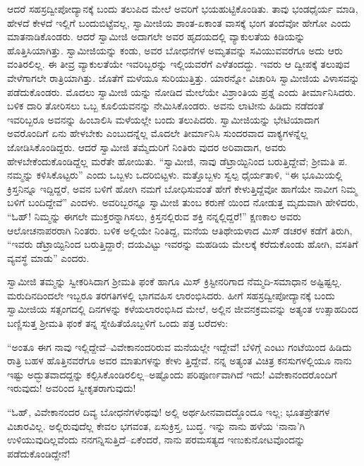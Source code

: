 ಆದರೆ ಸಹಸ್ರದ್ವೀಪೋದ್ಯಾನಕ್ಕೆ ಬಂದು ತಲುಪಿದ ಮೇಲೆ ಅವರಿಗೆ ಭಯಹುಟ್ಟಿಕೊಂಡಿತು. ತಾವು ಭಂಡಧೈರ್ಯ ಮಾಡಿ, ಹೇಳದೆ ಕೇಳದೆ ಇಲ್ಲಿಗೆ ಬಂದುಬಿಟ್ಟೆವಲ್ಲ, ಸ್ವಾಮೀಜಿಯ ಶಾಂತ-ಏಕಾಂತ ವಾಸಕ್ಕೆ ಭಂಗ ತಂದೆವೋ ಹೇಗೋ ಎಂದು ಮಾತನಾಡಿಕೊಂಡರು. ಆದರೆ ಸ್ವಾಮೀಜಿ ಅದಾಗಲೇ ಅವರ ಹೃದಯದಲ್ಲಿ ವ್ಯಾಕುಲತೆಯ ಕಿಡಿಯನ್ನು ಹೊತ್ತಿಸಿಯಾಗಿತ್ತು. ಸ್ವಾಮೀಜಿಯನ್ನು ಕಂಡು, ಅವರ ಬೋಧನೆಗಳ ಅಮೃತವನ್ನು ಸವಿಯುವವರೆಗೂ ಅದು ಆರು ವಂತಿರಲಿಲ್ಲ. ಈ ತೀವ್ರ ವ್ಯಾಕುಲತೆಯೇ ಇವರಿಬ್ಬರನ್ನು ಇಲ್ಲಿಯವರೆಗೆ ಎಳೆತಂದದ್ದು. ಇವರು ಆ ದ್ವೀಪಕ್ಕೆ ತಲುಪುವ ವೇಳೆಗಾಗಲೇ ರಾತ್ರಿಯಾಗಿತ್ತು. ಜೊತೆಗೆ ಮಳೆಯೂ ಸುರಿಯುತ್ತಿತ್ತು. ಯಾರನ್ನೋ ವಿಚಾರಿಸಿ ಸ್ವಾಮೀಜಿಯ ವಿಳಾಸವನ್ನು ಪಡೆದುಕೊಂಡರು. ಮೊದಲು ಸ್ವಾಮೀಜಿ ಯನ್ನು ನೋಡಿದ ಮೇಲೆಯೇ ವಿಶ್ರಾಂತಿಯ ಪ್ರಶ್ನೆ ಎಂದು ತೀರ್ಮಾನಿಸಿದರು. ಬಳಿಕ ದಾರಿ ತೋರಿಸಲು ಒಬ್ಬ ಕೂಲಿಯವನನ್ನು ನೇಮಿಸಿಕೊಂಡರು. ಅವನು ಲಾಟೀನು ಹಿಡಿದು ನಡೆದಂತೆ ಇವರಿಬ್ಬರೂ ಅವನನ್ನು ಹಿಂಬಾಲಿಸಿ ಮಳೆಯಲ್ಲೇ ಬಂದು ತಲುಪಿದರು. ಸ್ವಾಮೀಜಿಯನ್ನು ಭೇಟಿಯಾದಾಗ ಅವರೊಂದಿಗೆ ಏನು ಹೇಳಬೇಕು ಎಂಬುದನ್ನೆಲ್ಲ ಮೊದಲೇ ತೀರ್ಮಾನಿಸಿ ಸುಂದರವಾದ ವಾಕ್ಯಗಳನ್ನೆಲ್ಲ ಜೋಡಿಸಿಕೊಂಡಿದ್ದರು. ಆದರೆ ಸ್ವಾಮೀಜಿ ತಮ್ಮೆದುರಿಗೆ ನಿಂತಿರು ವುದರ ಅರಿವಾದಾಗ, ಅವರು ಹೇಳಬೇಕೆಂದುಕೊಂಡಿದ್ದೆಲ್ಲ ಮರೆತೇ ಹೋಯಿತು. “ಸ್ವಾಮೀಜಿ, ನಾವು ಡೆಟ್ರಾಯ್ಟಿನಿಂದ ಬರುತ್ತಿದ್ದೇವೆ; ಶ್ರೀಮತಿ ಪ. ನಮ್ಮನ್ನು ಕಳಿಸಿಕೊಟ್ಟರು” ಎಂದು ಒಬ್ಬಳು ಒದರಿಬಿಟ್ಟಳು. ಮತ್ತೊಬ್ಬಳು ಸ್ವಲ್ಪ ಧೈರ್ಯತಾಳಿ, “ಈ ಭೂಮಿಯಲ್ಲಿ ಕ್ರಿಸ್ತನಿನ್ನೂ ಇದ್ದಿದ್ದರೆ, ಅವನ ಬಳಿಗೆ ಹೋಗಿ ನಮಗೆ ಬೋಧಿಸುವಂತೆ ಹೇಗೆ ಕೇಳುತ್ತಿದ್ದೆವೋ ಹಾಗೆಯೇ ನಾವೀಗ ನಿಮ್ಮ ಬಳಿಗೆ ಬಂದಿದ್ದೇವೆ” ಎಂದಳು. ಅವರಿಬ್ಬರನ್ನೂ ಸ್ವಾಮೀಜಿ ತುಂಬ ಕರುಣೆ ಯಿಂದ ನೋಡುತ್ತ ಮೃದುವಾಗಿ ಹೇಳಿದರು, “ಓಹ್! ನಿಮ್ಮನ್ನು ಈಗಲೇ ಮುಕ್ತರನ್ನಾಗಿಸಲು, ಕ್ರಿಸ್ತನಲ್ಲಿರುವ ಶಕ್ತಿ ನನ್ನಲ್ಲಿದ್ದರೆ!” ಕ್ಷಣಕಾಲ ಅವರು ಆಲೋಚನಾಪರರಾಗಿ ನಿಂತರು. ಬಳಿಕ ಅಲ್ಲಿಯೇ ನಿಂತಿದ್ದ, ಮನೆಯ ಆತಿಥೇಯಳಾದ ಮಿಸ್ ಡಚರಳ ಕಡೆಗೆ ತಿರುಗಿ, “ಇವರು ಡೆಟ್ರಾಯ್ಟಿನಿಂದ ಬರುತ್ತಿದ್ದಾರೆ; ದಯವಿಟ್ಟು ಇವರನ್ನು ಮಹಡಿಯ ಮೇಲಕ್ಕೆ ಕರೆದುಕೊಂಡು ಹೋಗಿ, ವಸತಿಗೆ ವ್ಯವಸ್ಥೆ ಮಾಡು” ಎಂದರು.

ಸ್ವಾಮೀಜಿ ತಮ್ಮನ್ನು ಸ್ವೀಕರಿಸಿದಾಗ ಶ್ರೀಮತಿ ಫಂಕೆ ಹಾಗೂ ಮಿಸ್ ಕ್ರಿಸ್ಟೀನರಿಗಾದ ನೆಮ್ಮದಿ-ಸಮಾಧಾನ ಅಷ್ಟಿಷ್ಟಲ್ಲ. ಮರುದಿನದಿಂದಲೇ ಇಬ್ಬರೂ ತರಗತಿಗಳಲ್ಲಿ ಭಾಗವಹಿಸ ಲಾರಂಭಿಸಿದರು. ಹೀಗೆ ಸಹಸ್ರದ್ವೀಪೋದ್ಯಾನಕ್ಕೆ ಬಂದು ಸ್ವಾಮೀಜಿಯ ಸತ್ಸಂಗದಲ್ಲಿ ದಿನಗಳನ್ನು ಕಳೆಯಲಾರಂಭಿಸಿದ ಮೇಲೆ, ಅಲ್ಲಿನ ಜೀವನಕ್ರಮವನ್ನು ಅತ್ಯಂತ ಉತ್ಸಾಹದಿಂದ ಬಣ್ಣಿಸುತ್ತ ಶ್ರೀಮತಿ ಫಂಕೆ ತನ್ನ ಸ್ನೇಹಿತೆಯೊಬ್ಬಳಿಗೆ ಒಂದು ಪತ್ರ ಬರೆದಳು:

“ಅಂತೂ ಈಗ ನಾವು ಇಲ್ಲಿದ್ದೇವೆ–ವಿವೇಕಾನಂದರಿರುವ ಮನೆಯಲ್ಲೇ ಇದ್ದೇವೆ! ಬೆಳಿಗ್ಗೆ ಎಂಟು ಗಂಟೆಯಿಂದ ಹಿಡಿದು ರಾತ್ರಿ ಬಹಳ ಹೊತ್ತಿನವರೆಗೂ ಅವರ ಮಾತುಗಳನ್ನು ಕೇಳು ತ್ತಿದ್ದೇವೆ. ನನ್ನ ಅತ್ಯಂತ ವಿಚಿತ್ರ ಕನಸುಗಳಲ್ಲಿಯೂ ನಾನು ಇಷ್ಟು ಅದ್ಭುತವಾದದ್ದನ್ನು ಕಲ್ಪಿಸಿಕೊಂಡಿರಲಿಲ್ಲ–ಅಷ್ಟೊಂದು ಪರಿಪೂರ್ಣವಾಗಿದೆ ಇದು! ವಿವೇಕಾನಂದರೊಂದಿಗೆ ಇರುವುದು! ಅವರಿಂದ ಸ್ವೀಕೃತರಾಗುವುದು!

“ಓಹ್, ವಿವೇಕಾನಂದರ ದಿವ್ಯ ಬೋಧನೆಗಳೆಂಥವು! ಅಲ್ಲಿ ಅರ್ಥಹೀನವಾದದ್ದೊಂದೂ ಇಲ್ಲ; ಭೂತಪ್ರೇತಗಳ ವಿಚಾರವಿಲ್ಲ. ಅಲ್ಲಿರುವುದೆಲ್ಲ ಕೇವಲ ಭಗವಂತ, ಏಸುಕ್ರಿಸ್ತ, ಬುದ್ಧ. ಇನ್ನು ನಾನು ಹಳೆಯ ‘ನಾನಾ’ಗಿ ಉಳಿಯುವುದಿಲ್ಲವೆಂದು ನನಗನ್ನಿಸುತ್ತಿದೆ–ಏಕೆಂದರೆ, ನಾನು ಪರಮಸತ್ಯದ ಇಣುಕುನೋಟವೊಂದನ್ನು ಪಡೆದುಕೊಂಡಿದ್ದೇನೆ!

